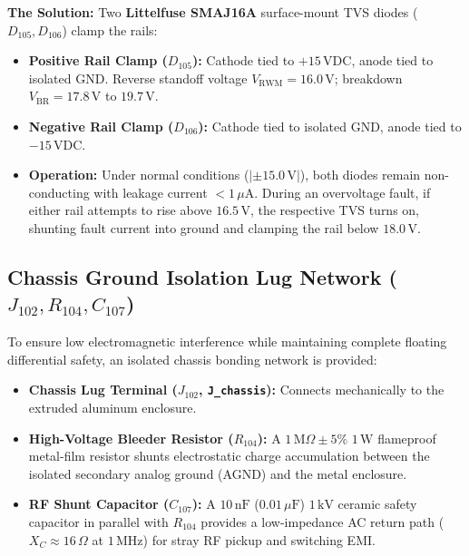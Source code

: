 \documentclass[11pt, letterpaper]{article}
\begin{document}
\textbf{The Solution:} Two \textbf{Littelfuse SMAJ16A} surface-mount TVS diodes ($D_{105}, D_{106}$) clamp the rails:
\begin{itemize}[leftmargin=1.5em]
    \item \textbf{Positive Rail Clamp ($D_{105}$):} Cathode tied to $+15\,\text{VDC}$, anode tied to isolated GND. Reverse standoff voltage $V_{\text{RWM}} = 16.0\,\text{V}$; breakdown $V_{\text{BR}} = 17.8\,\text{V}$ to $19.7\,\text{V}$.
    \item \textbf{Negative Rail Clamp ($D_{106}$):} Cathode tied to isolated GND, anode tied to $-15\,\text{VDC}$.
    \item \textbf{Operation:} Under normal conditions ($|\pm 15.0\,\text{V}|$), both diodes remain non-conducting with leakage current $< 1\,\mu\text{A}$. During an overvoltage fault, if either rail attempts to rise above $16.5\,\text{V}$, the respective TVS turns on, shunting fault current into ground and clamping the rail below $18.0\,\text{V}$.
\end{itemize}

\subsection{Chassis Ground Isolation Lug Network \texorpdfstring{($J_{102}, R_{104}, C_{107}$)}{(J102, R104, C107)}}
To ensure low electromagnetic interference while maintaining complete floating differential safety, an isolated chassis bonding network is provided:
\begin{itemize}[leftmargin=1.5em]
    \item \textbf{Chassis Lug Terminal ($J_{102}$, \texttt{J\_chassis}):} Connects mechanically to the extruded aluminum enclosure.
    \item \textbf{High-Voltage Bleeder Resistor ($R_{104}$):} A $1\,\text{M}\Omega \pm 5\%$ $1\,\text{W}$ flameproof metal-film resistor shunts electrostatic charge accumulation between the isolated secondary analog ground (AGND) and the metal enclosure.
    \item \textbf{RF Shunt Capacitor ($C_{107}$):} A $10\,\text{nF}$ ($0.01\,\mu\text{F}$) $1\,\text{kV}$ ceramic safety capacitor in parallel with $R_{104}$ provides a low-impedance AC return path ($X_C \approx 16\,\Omega$ at $1\,\text{MHz}$) for stray RF pickup and switching EMI.
\end{itemize}
\end{document}
